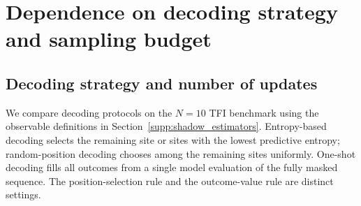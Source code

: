 \documentclass[11pt,a4paper]{article}
\newcommand{\TBD}[1]{\textcolor{red!70!black}{\textsf{[TBD: #1]}}}
\newcommand{\sechead}[2]{\section{#2}}
\newcommand{\subhead}[1]{\subsection*{#1}}
\begin{document}


\sechead{S7}{Dependence on decoding strategy and sampling budget}
\label{supp:decoding_budget}

\subhead{Decoding strategy and number of updates}
We compare decoding protocols on the $N=10$ TFI benchmark using the
observable definitions in Section~\ref{supp:shadow_estimators}. Entropy-based decoding selects
the remaining site or sites with the lowest predictive entropy;
random-position decoding chooses among the remaining sites uniformly.
One-shot decoding fills all outcomes from a single model evaluation of
the fully masked sequence. The position-selection rule and the
outcome-value rule are distinct settings. 
\end{document}
